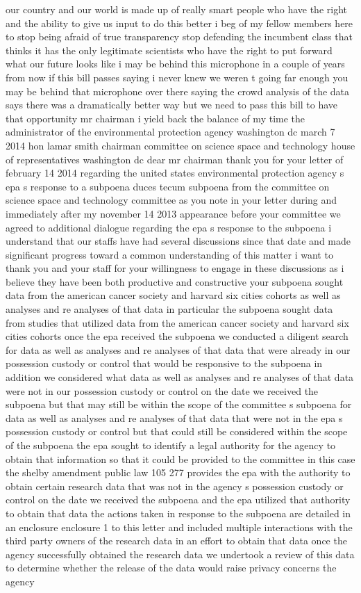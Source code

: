 \documentclass{article}
\begin{document}
our country and our world is made up of really smart people who have the right and the ability to give us input to do this better i beg of my fellow members here to stop being afraid of true transparency stop defending the incumbent class that thinks it has the only legitimate scientists who have the right to put forward what our future looks like i may be behind this microphone in a couple of years from now if this bill passes saying i never knew we weren t going far enough you may be behind that microphone over there saying the crowd analysis of the data says there was a dramatically better way but we need to pass this bill to have that opportunity mr chairman i yield back the balance of my time the administrator of the environmental protection agency washington dc march 7 2014 hon lamar smith chairman committee on science space and technology house of representatives washington dc dear mr chairman thank you for your letter of february 14 2014 regarding the united states environmental protection agency s epa s response to a subpoena duces tecum subpoena from the committee on science space and technology committee as you note in your letter during and immediately after my november 14 2013 appearance before your committee we agreed to additional dialogue regarding the epa s response to the subpoena i understand that our staffs have had several discussions since that date and made significant progress toward a common understanding of this matter i want to thank you and your staff for your willingness to engage in these discussions as i believe they have been both productive and constructive your subpoena sought data from the american cancer society and harvard six cities cohorts as well as analyses and re analyses of that data in particular the subpoena sought data from studies that utilized data from the american cancer society and harvard six cities cohorts once the epa received the subpoena we conducted a diligent search for data as well as analyses and re analyses of that data that were already in our possession custody or control that would be responsive to the subpoena in addition we considered what data as well as analyses and re analyses of that data were not in our possession custody or control on the date we received the subpoena but that may still be within the scope of the committee s subpoena for data as well as analyses and re analyses of that data that were not in the epa s possession custody or control but that could still be considered within the scope of the subpoena the epa sought to identify a legal authority for the agency to obtain that information so that it could be provided to the committee in this case the shelby amendment public law 105 277 provides the epa with the authority to obtain certain research data that was not in the agency s possession custody or control on the date we received the subpoena and the epa utilized that authority to obtain that data the actions taken in response to the subpoena are detailed in an enclosure enclosure 1 to this letter and included multiple interactions with the third party owners of the research data in an effort to obtain that data once the agency successfully obtained the research data we undertook a review of this data to determine whether the release of the data would raise privacy concerns the agency 
\end{document}

